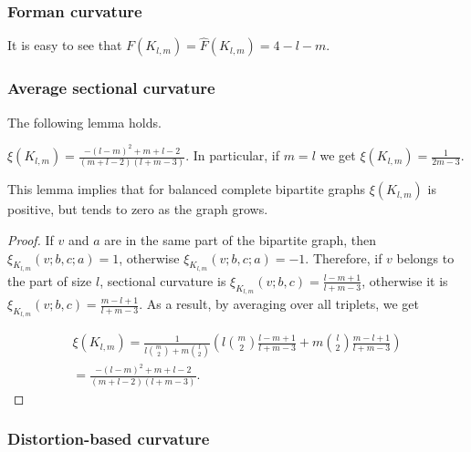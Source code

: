 \documentclass[runningheads]{llncs}
\begin{document}
\subsubsection{Forman curvature} 
It is easy to see that
$F(K_{l,m}) = \hat F(K_{l,m}) = 4 - l - m$. 


\subsubsection{Average sectional curvature} 
The following lemma holds.

\begin{lemma}\label{lem:bipartite_heuristic}
$
\xi({K_{l,m}}) = \frac{-(l - m)^2 + m + l - 2}{(m+l-2)(l+m-3)}.
$
In particular, if $m = l$ we get $\xi({K_{l,m}}) = \frac{1}{2m - 3}$. 
\end{lemma}
This lemma implies that for balanced complete bipartite graphs $\xi({K_{l,m}})$ is positive, but tends to zero as the graph grows.

\begin{proof}
If $v$ and $a$ are in the same part of the bipartite graph, then $\xi_{K_{l,m}}(v;b,c;a) = 1$, otherwise $\xi_{K_{l,m}}(v;b,c;a) = -1$. Therefore, if $v$ belongs to the part of size $l$, sectional curvature is
$\xi_{K_{l,m}}(v;b,c) = \frac{l-m+1}{l+m-3}$, otherwise it is $\xi_{K_{l,m}}(v;b,c) = \frac{m-l+1}{l+m-3}$. As a result, by averaging over all triplets, we get

\begin{multline*}
\xi({K_{l,m}}) = \frac{1}{l \binom{m}{2} + m \binom{l}{2}} \left(l \binom{m}{2} \frac{l-m+1}{l+m-3} + m \binom{l}{2} \frac{m-l+1}{l+m-3}\right) \\
= \frac{-(l - m)^2 + m + l - 2}{(m+l-2)(l+m-3)}.
\end{multline*}
\end{proof}



\subsubsection{Distortion-based curvature} 
\end{document}
